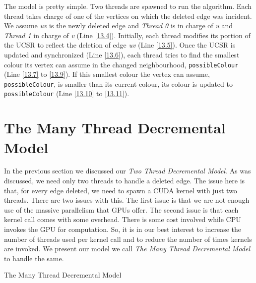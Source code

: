 \documentclass[MTech]{iitmdiss}
\makeatletter
\def\BState{\State\hskip-\ALG@thistlm}
\makeatother
\begin{document}
The model is pretty simple. Two threads are spawned to run the algorithm. Each thread takes charge of one of the vertices on which the deleted edge was incident. We assume \textit{uv} is the newly deleted edge and \textit{Thread 0} is in charge of \textit{u} and \textit{Thread 1} in charge of \textit{v} (Line \ref{13.4}). Initially, each thread modifies its portion of the UCSR to reflect the deletion of edge \textit{uv} (Line \ref{13.5}). Once the UCSR is updated and synchronized (Line \ref{13.6}), each thread tries to find the smallest colour its vertex can assume in the changed neighbourhood, \verb+possibleColour+ (Line \ref{13.7} to \ref{13.9}). If this smallest colour the vertex can assume, \verb+possibleColour+, is smaller than its current colour, its colour is updated to \verb+possibleColour+ (Line \ref{13.10} to \ref{13.11}). 

\section{The Many Thread Decremental Model}
In the previous section we discussed our \textit{Two Thread Decremental Model}. As was discussed, we need only two threads to handle a deleted edge. The issue here is that, for every edge deleted, we need to spawn a CUDA kernel with just two threads. There are two issues with this. The first issue is that we are not enough use of the massive parallelism that GPUs offer. The second issue is that each kernel call comes with some overhead. There is some cost involved while CPU invokes the GPU for computation. So, it is in our best interest to increase the number of threads used per kernel call and to reduce the number of times kernels are invoked. We present our model we call \textit{The Many Thread Decremental Model} to handle the same.

\begin{algorithm}
\caption{The Many Thread Decremental Model}\label{manythreadDecremental}
\end{algorithm}
\end{document}
